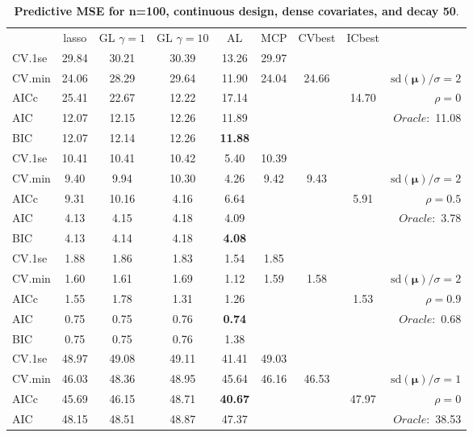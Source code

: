 \clearpage
\begin{table}\vspace{-.5cm}
\caption[l]{ { \bf Predictive MSE for n=100, continuous design, 
dense covariates, and  decay  50}.}
\vspace{-.5cm}
\footnotesize{}
\begin{center}
\begin{tabular}{l*{7}{c}|r}
 & lasso & GL $\gamma=1$ & GL $\gamma=10$ & AL & MCP  & CVbest & ICbest  \\
\cline{1-9}
CV.1se & 29.84 & 30.21 & 30.39 & 13.26 & 29.97 & & & \\
CV.min & 24.06 & 28.29 & 29.64 & 11.90 & 24.04 & 24.66 & & $\mathrm{sd}(\mathbf{\mu})/\sigma=2$ \\
AICc & 25.41 & 22.67 & 12.22 & 17.14 & & & 14.70 &  $\rho=0$ \\
AIC & 12.07 & 12.15 & 12.26 & 11.89 & & & &  \multirow{2}{*}{$Oracle: $ 11.08} \\
BIC & 12.07 & 12.14 & 12.26 & {\bf 11.88} & & & &  \\
 \hline 
CV.1se & 10.41 & 10.41 & 10.42 & 5.40 & 10.39 & & & \\
CV.min & 9.40 & 9.94 & 10.30 & 4.26 & 9.42 & 9.43 & & $\mathrm{sd}(\mathbf{\mu})/\sigma=2$ \\
AICc & 9.31 & 10.16 & 4.16 & 6.64 & & & 5.91 &  $\rho=0.5$ \\
AIC & 4.13 & 4.15 & 4.18 & 4.09 & & & &  \multirow{2}{*}{$Oracle: $ 3.78} \\
BIC & 4.13 & 4.14 & 4.18 & {\bf 4.08} & & & &  \\
 \hline 
CV.1se & 1.88 & 1.86 & 1.83 & 1.54 & 1.85 & & & \\
CV.min & 1.60 & 1.61 & 1.69 & 1.12 & 1.59 & 1.58 & & $\mathrm{sd}(\mathbf{\mu})/\sigma=2$ \\
AICc & 1.55 & 1.78 & 1.31 & 1.26 & & & 1.53 &  $\rho=0.9$ \\
AIC & 0.75 & 0.75 & 0.76 & {\bf 0.74} & & & &  \multirow{2}{*}{$Oracle: $ 0.68} \\
BIC & 0.75 & 0.75 & 0.76 & 1.38 & & & &  \\
 \hline 
CV.1se & 48.97 & 49.08 & 49.11 & 41.41 & 49.03 & & & \\
CV.min & 46.03 & 48.36 & 48.95 & 45.64 & 46.16 & 46.53 & & $\mathrm{sd}(\mathbf{\mu})/\sigma=1$ \\
AICc & 45.69 & 46.15 & 48.71 & {\bf 40.67} & & & 47.97 &  $\rho=0$ \\
AIC & 48.15 & 48.51 & 48.87 & 47.37 & & & &  \multirow{2}{*}{$Oracle: $ 38.53} \\

\end{tabular}
\end{center}
\end{table}
